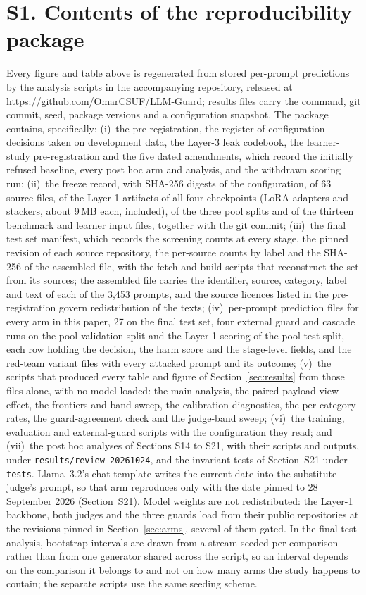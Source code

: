 \documentclass[journal]{IEEEtran}
\begin{document}
\section*{S1. Contents of the reproducibility package}

Every figure and table above is regenerated from stored per-prompt predictions
by the analysis scripts in the accompanying repository, released at
\url{https://github.com/OmarCSUF/LLM-Guard}; results files carry the
command, git commit, seed, package versions and a configuration snapshot.
The package contains, specifically: (i)~the pre-registration, the register of
configuration decisions taken on development data, the Layer-3 leak codebook,
the learner-study pre-registration and the five dated amendments, which record
the initially refused baseline, every post hoc arm and analysis, and the
withdrawn scoring run; (ii)~the freeze record, with SHA-256 digests of the
configuration, of 63 source files, of the Layer-1 artifacts of all four
checkpoints (LoRA adapters and stackers, about 9\,MB each, included), of the
three pool splits and of the thirteen benchmark and learner input files,
together with the git commit; (iii)~the final test set manifest, which records
the screening counts at every stage, the pinned revision of each source
repository, the per-source counts by label and the SHA-256 of the assembled
file, with the fetch and build scripts that reconstruct the set from its
sources; the assembled file carries the identifier, source, category, label
and text of each of the 3{,}453 prompts, and the source licences listed in the
pre-registration govern redistribution of the texts; (iv)~per-prompt prediction
files for every arm in this paper, 27 on the final test set, four external
guard and cascade runs on the pool validation split and the Layer-1 scoring of
the pool test split, each row holding the decision, the harm score and the
stage-level fields, and the red-team variant files with every attacked prompt
and its outcome; (v)~the scripts that produced every table and figure of
Section~\ref{sec:results} from those files alone, with no model loaded: the
main analysis, the paired payload-view effect, the frontiers and band sweep,
the calibration diagnostics, the per-category rates, the guard-agreement check
and the judge-band sweep; (vi)~the training, evaluation and external-guard
scripts with the configuration they read; and (vii)~the post hoc analyses of
Sections S14 to S21, with their scripts and outputs, under
\texttt{results/\allowbreak review\_20261024}, and the invariant tests of Section~S21 under \texttt{tests}. Llama~3.2's chat
template writes the current date into the substitute judge's prompt, so that arm
reproduces only with the date pinned to 28 September 2026 (Section~S21). Model weights are not redistributed:
the Layer-1 backbone, both judges and the three guards load from their public
repositories at the revisions pinned in Section~\ref{sec:arms}, several of
them gated. In the final-test analysis, bootstrap intervals are drawn from a
stream seeded per comparison rather than from one generator shared across the
script, so an interval depends on the comparison it belongs to and not on how
many arms the study happens to contain; the separate scripts use the same
seeding scheme.
\end{document}
